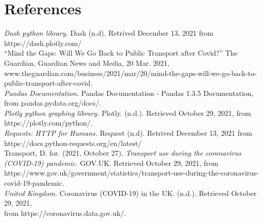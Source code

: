 \documentclass[fontsize=11pt]{article}
\begin{document}
\section*{References}
\begin{hangparas}{.25in}{1}
\textit{Dash python library.} Dash (n.d). Retrived December 13, 2021 from https://dash.plotly.com/ \\

“Mind the Gaps: Will We Go Back to Public Transport after Covid?” The Guardian, Guardian News and Media, 20 Mar. 2021, www.theguardian.com/business/2021/mar/20/mind-the-gaps-will-we-go-back-to-public-transport-after-covid. \\

\textit{Pandas Documentation.} Pandas Documentation - Pandas 1.3.5 Documentation, from pandas.pydata.org/docs/. \\

\textit{Plotly python graphing library. } Plotly. (n.d.). Retrieved October 29, 2021, from https://plotly.com/python/. \\

\textit{Requests: HTTP for Humans.} Request (n.d). Retrived December 13, 2021 from https://docs.python-requests.org/en/latest/ \\

Transport, D. for. (2021, October 27). \textit{Transport use during the coronavirus (COVID-19) pandemic.} GOV.UK. Retrieved October 29, 2021, from https://www.gov.uk/government/statistics/transport-use-during-the-coronavirus-covid-19-pandemic. \\


\textit{United Kingdom.} Coronavirus (COVID-19) in the UK. (n.d.). Retrieved October 29, 2021, \\ from https://coronavirus.data.gov.uk/.


\end{hangparas}
\end{document}

